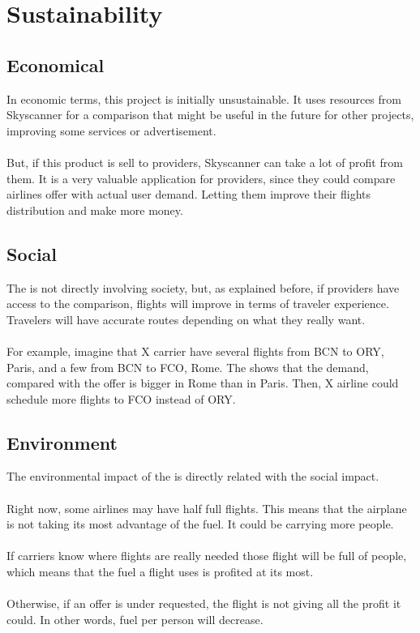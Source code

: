 \section{Sustainability}

\subsection{Economical}

In economic terms, this project is initially unsustainable. It uses resources from Skyscanner for a comparison that might be useful in the future for other projects, improving some services or advertisement.
\\\\
But, if this product is sell to providers, Skyscanner can take a lot of profit from them. It is a very valuable application for providers, since they could compare airlines offer with actual user demand. Letting them improve their flights distribution and make more money.

\subsection{Social}

The \thesis is not directly involving society, but, as explained before, if providers have access to the comparison, flights will improve in terms of traveler experience. Travelers will have accurate routes depending on what they really want.
\\\\
For example, imagine that X carrier have several flights from BCN to ORY, Paris, and a few from BCN to FCO, Rome. The \thesis shows that the demand, compared with the offer is bigger in Rome than in Paris. Then, X airline could schedule more flights to FCO instead of ORY.

\subsection{Environment}

The environmental impact of the \thesis is directly related with the social impact.
\\\\
Right now, some airlines may have half full flights. This means that the airplane is not taking its most advantage of the fuel. It could be carrying more people.
\\\\
If carriers know where flights are really needed those flight will be full of people, which means that the fuel a flight uses is profited at its most.
\\\\
Otherwise, if an offer is under requested, the flight is not giving all the profit it could. In other words, fuel per person will decrease.

